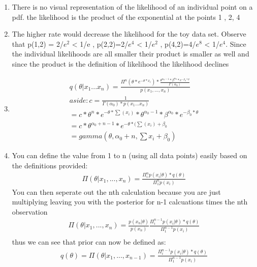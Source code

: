\documentclass{article}
\begin{document}
\begin{enumerate}
\begin{enumerate}
\begin{minipage}{\linewidth}
				 \end{minipage}		
			\item 
				There is no visual representation of the likelihood of an individual point on a pdf. the likelihood is the product of the exponential at the points 1 , 2, 4 
			\item
				The higher rate would decrease the likelihood for the toy data set. Observe that p(1,2) = 2/$e^{2}$ < 1/e , p(2,2)=2/$e^{4}$ < 1/$e^{2}$ , p(4,2)=4/$e^{8}$ < 1/$e^{4}$. Since the individual likelihoods are all smaller their product is smaller as well and since the product is the definition of likelihood the likelihood declines
			\item 
				\begin{gather*}
					 q(\theta| x_{1} ... x_{n})= \frac{\Pi^{n}( \theta * e^{-\theta * x_{i}})*\frac{\theta^{\alpha_{0}-1}*\beta^{\alpha_{0}}*e^{-\beta_{0}*\theta}}{\Gamma(\alpha_{0})}}{p(x_{1},...,x_{n})} \\
					 aside: c = \frac{1}{\Gamma(\alpha_{0})*p(x_{1} ... x_{n})} \\
					 = c*\theta^{n}*e^{-\theta*\sum(x_{i})}*\theta^{\alpha_{0}-1}*\beta^{\alpha_{0}}*e^{-\beta_{0}*\theta} \\
					 =c*\theta^{\alpha_{0}+n-1}*e^{-\theta*(\sum(x_{i})+\beta_{0}} \\
					 = gamma(\theta, \alpha_{0}+n, \sum x_{i}+\beta_{0})
				\end{gather*}
			\item
				You can define the value from 1 to n (using all data points) easily based on the definitions provided: 
				\begin{gather*}
					\Pi(\theta | x_{1},...,x_{n}) = \frac{\Pi_{i}^{n}p(x_{i}|\theta)*q(\theta)}{\Pi_{1}^{n}p(x_{i})} 
				\end{gather*}
				You can then seperate out the nth calculation because you are just multiplying leaving you with the posterior for n-1 calcuations times the nth observation
				\begin{gather*}
					\Pi(\theta | x_{1},...,x_{n}) = \frac{p(x_{n}|\theta)}{p(x_{n})} \frac{\Pi_{i}^{n-1}p(x_{i}|\theta)*q(\theta)}{\Pi_{1}^{n-1}p(x_{i})} \\
				\end{gather*}
				thus we can see that prior can now be defined as:
				\begin{gather*}
					q(\theta) = \Pi(\theta|x_{1},...,x_{n-1}) = \frac{\Pi_{i}^{n-1}p(x_{i}|\theta)*q(\theta)}{\Pi_{1}^{n-1}p(x_{i})}
				\end{gather*}

\end{enumerate}
\end{enumerate}
\end{document}
